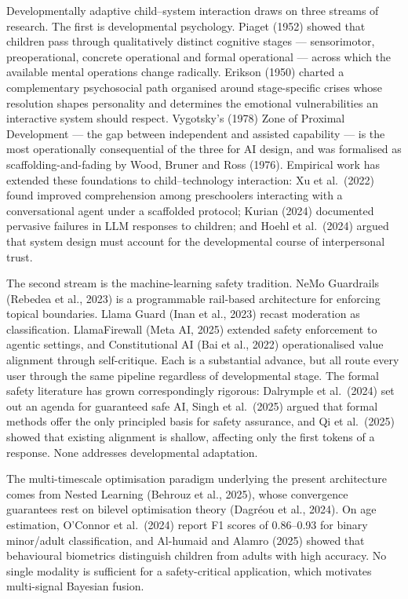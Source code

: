 \documentclass[fleqn,10pt]{wlscirep}
\begin{document}
Developmentally adaptive child--system interaction draws on three streams of research. The first is developmental psychology. Piaget (1952)\cite{Piaget1952} showed that children pass through qualitatively distinct cognitive stages --- sensorimotor, preoperational, concrete operational and formal operational --- across which the available mental operations change radically. Erikson (1950)\cite{Erikson1950} charted a complementary psychosocial path organised around stage-specific crises whose resolution shapes personality and determines the emotional vulnerabilities an interactive system should respect. Vygotsky's (1978)\cite{Vygotsky1978} Zone of Proximal Development --- the gap between independent and assisted capability --- is the most operationally consequential of the three for AI design, and was formalised as scaffolding-and-fading by Wood, Bruner and Ross (1976)\cite{Wood1976}. Empirical work has extended these foundations to child--technology interaction: Xu et al.\ (2022)\cite{Xu2022} found improved comprehension among preschoolers interacting with a conversational agent under a scaffolded protocol; Kurian (2024)\cite{Kurian2024} documented pervasive failures in LLM responses to children; and Hoehl et al.\ (2024)\cite{Hoehl2024} argued that system design must account for the developmental course of interpersonal trust.

The second stream is the machine-learning safety tradition. NeMo Guardrails (Rebedea et al., 2023)\cite{Rebedea2023} is a programmable rail-based architecture for enforcing topical boundaries. Llama Guard (Inan et al., 2023)\cite{Inan2023} recast moderation as classification. LlamaFirewall (Meta AI, 2025)\cite{MetaAI2025} extended safety enforcement to agentic settings, and Constitutional AI (Bai et al., 2022)\cite{Bai2022} operationalised value alignment through self-critique. Each is a substantial advance, but all route every user through the same pipeline regardless of developmental stage. The formal safety literature has grown correspondingly rigorous: Dalrymple et al.\ (2024)\cite{Dalrymple2024} set out an agenda for guaranteed safe AI, Singh et al.\ (2025)\cite{Singh2025} argued that formal methods offer the only principled basis for safety assurance, and Qi et al.\ (2025)\cite{Qi2025} showed that existing alignment is shallow, affecting only the first tokens of a response. None addresses developmental adaptation.

The multi-timescale optimisation paradigm underlying the present architecture comes from Nested Learning (Behrouz et al., 2025)\cite{Behrouz2025}, whose convergence guarantees rest on bilevel optimisation theory (Dagr\'{e}ou et al., 2024)\cite{Dagreou2024}. On age estimation, O'Connor et al.\ (2024)\cite{OConnor2024} report F1 scores of 0.86--0.93 for binary minor/adult classification, and Al-humaid and Alamro (2025)\cite{Alhumaid2025} showed that behavioural biometrics distinguish children from adults with high accuracy. No single modality is sufficient for a safety-critical application, which motivates multi-signal Bayesian fusion.
\end{document}
